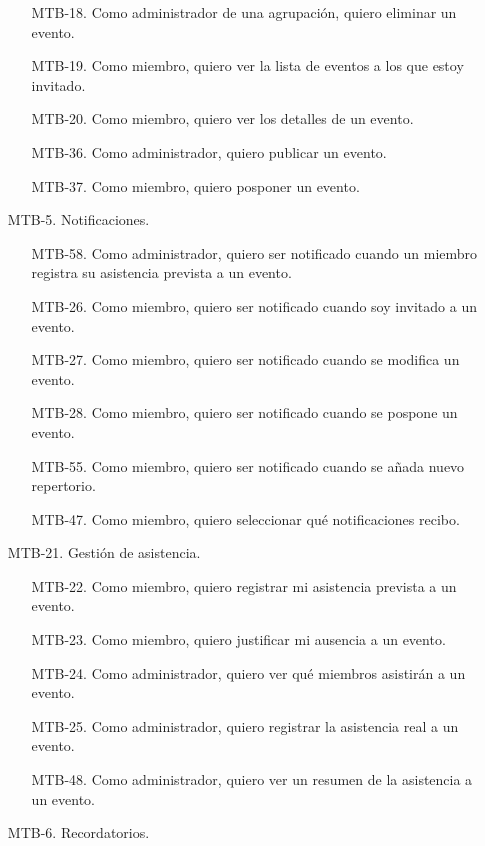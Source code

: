 \begin{enumerate}
\begin{enumerate}
            \item[MTB-18.] Como administrador de una agrupación, quiero eliminar un evento.
            \item[MTB-19.] Como miembro, quiero ver la lista de eventos a los que estoy invitado.
            \item[MTB-20.] Como miembro, quiero ver los detalles de un evento.
            \item[MTB-36.] Como administrador, quiero publicar un evento.
            \item[MTB-37.] Como miembro, quiero posponer un evento.
        \end{enumerate}
    \item[MTB-5.] Notificaciones.
        \begin{enumerate}
            \item[MTB-58.] Como administrador, quiero ser notificado cuando un miembro registra su asistencia prevista a un evento.
            \item[MTB-26.] Como miembro, quiero ser notificado cuando soy invitado a un evento.
            \item[MTB-27.] Como miembro, quiero ser notificado cuando se modifica un evento.
            \item[MTB-28.] Como miembro, quiero ser notificado cuando se pospone un evento.
            \item[MTB-55.] Como miembro, quiero ser notificado cuando se añada nuevo repertorio.
            \item[MTB-47.] Como miembro, quiero seleccionar qué notificaciones recibo.
        \end{enumerate}
    \item[MTB-21.] Gestión de asistencia.
        \begin{enumerate}
            \item[MTB-22.] Como miembro, quiero registrar mi asistencia prevista a un evento.
            \item[MTB-23.] Como miembro, quiero justificar mi ausencia a un evento.
            \item[MTB-24.] Como administrador, quiero ver qué miembros asistirán a un evento.
            \item[MTB-25.] Como administrador, quiero registrar la asistencia real a un evento.
            \item[MTB-48.] Como administrador, quiero ver un resumen de la asistencia a un evento.
        \end{enumerate}
    \item[MTB-6.] Recordatorios.

\end{enumerate}
